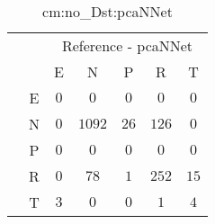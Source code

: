 \begin{table}[!ht]
	\centering
	\begin{tabular}{|c|c|c|c|c|c|c|}
		\cline{3-7}
		\multicolumn{2}{c|}{} & \multicolumn{5}{|c|}{Reference - pcaNNet} \\ \cline{3-7}
		\multicolumn{2}{c|}{} & E & N & P & R & T \\ \hline
		\multirow{5}{*}{\rotatebox{90}{Prediction}} & E & $0$ & $0$ & $0$ & $0$ & $0$ \\ \cline{2-7}
		 & N & $0$ & $1092$ & $26$ & $126$ & $0$ \\ \cline{2-7}
		 & P & $0$ & $0$ & $0$ & $0$ & $0$ \\ \cline{2-7}
		 & R & $0$ & $78$ & $1$ & $252$ & $15$ \\ \cline{2-7}
		 & T & $3$ & $0$ & $0$ & $1$ & $4$ \\ \hline
	\end{tabular}
	\caption{cm:no_Dst:pcaNNet}
	\label{tab:cm:no_Dst:pcaNNet}
\end{table}
